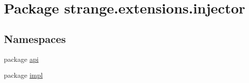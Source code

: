 \hypertarget{namespacestrange_1_1extensions_1_1injector}{\section{Package strange.\-extensions.\-injector}
\label{namespacestrange_1_1extensions_1_1injector}
}
\subsection*{Namespaces}
\begin{DoxyCompactItemize}
\item 
package \hyperlink{namespacestrange_1_1extensions_1_1injector_1_1api}{api}
\item 
package \hyperlink{namespacestrange_1_1extensions_1_1injector_1_1impl}{impl}
\end{DoxyCompactItemize}
